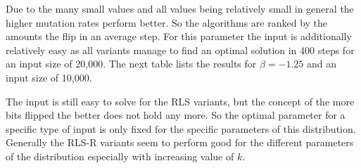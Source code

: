 Due to the many small values and all values being relatively small in general the higher mutation rates perform better.
So the algorithms are ranked by the amounts the flip in an average step.
For this parameter the input is additionally relatively easy as all variants manage to find an optimal solution in 400 steps for an input size of 20,000.
The next table lists the results for $\beta=-1.25$ and an input size of 10,000.


The input is still easy to solve for the RLS variants, but the concept of the more bits flipped the better does not hold any more.
So the optimal parameter for a specific type of input is only fixed for the specific parameters of this distribution.
Generally the RLS-R variants seem to perform good for the different parameters of the distribution especially with increasing value of $k$.
